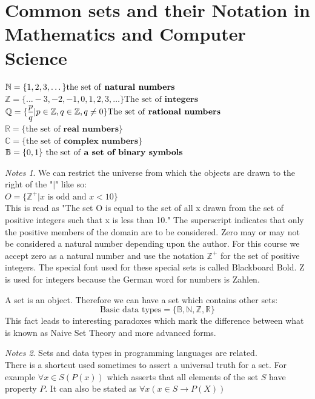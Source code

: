 \documentclass[11pt]{book} %
\theoremstyle {definition}
\theoremstyle {remark}
\newtheorem*{notes}{Notes}
\begin{document}
\section {Common sets and their Notation in Mathematics and Computer Science}
 $\mathbb{N}=\{1,2,3, \dots \} \text {the set of \textbf{natural numbers} } $ \\
 $\mathbb{Z}=\{\dots -3,-2,-1,0,1,2,3, \dots\}  \text{The set of } \textbf{integers}$ \\
 $\mathbb{Q}=\{\dfrac{p}{q} | p \in \mathbb{Z}, q \in \mathbb{Z}, q \neq 0 \} \text{The set of \textbf{rational numbers}}$ \\
 $\mathbb{R}=\{ \text{the set of }\textbf{real numbers}   \} $ \\
 $\mathbb{C}=\{ \text{the set of }\textbf{complex numbers} \} $ \\
 $\mathbb{B}=\{0,1\} \text{ the set of \textbf{a set of binary symbols} } $ \\

\begin {notes}
 We can restrict the universe from which the objects are drawn to the right of the "$|$" like so: \\
 $O=\{\mathbb{Z}^+ | x \text{ is odd and } x<10 \}$  \\
This is read as "The set O is equal to the set of all x drawn from the set of positive integers such that x is less than 10."
The superscript indicates that only the positive members of the domain are to be considered.
Zero may or may not be considered a natural number depending upon the author. For this course we accept zero as a natural number and use the notation $\mathbb{Z}^+$ for the set of positive integers. The special font used for these special sets is called Blackboard Bold. Z is used for integers because the German word for numbers is Zahlen.
\end{notes}

  A set is an object. Therefore we can have a set which contains other sets:
  $$ \text{Basic data types} = \{\mathbb{B}, \mathbb{N}, \mathbb{Z}, \mathbb{R} \}$$
This fact leads to interesting paradoxes which mark the difference between what is known as Naive Set Theory and more advanced forms.

\begin{notes}
Sets and data types in programming languages are related.\\
There is a shortcut used sometimes to assert a universal truth for a set. For example $\forall x \in S(P(x))$ which asserts that all elements of the set $S$ have property $P$. It can also be stated as $\forall x(x \in S \rightarrow P(X))$
\end{notes}
\end{document}
